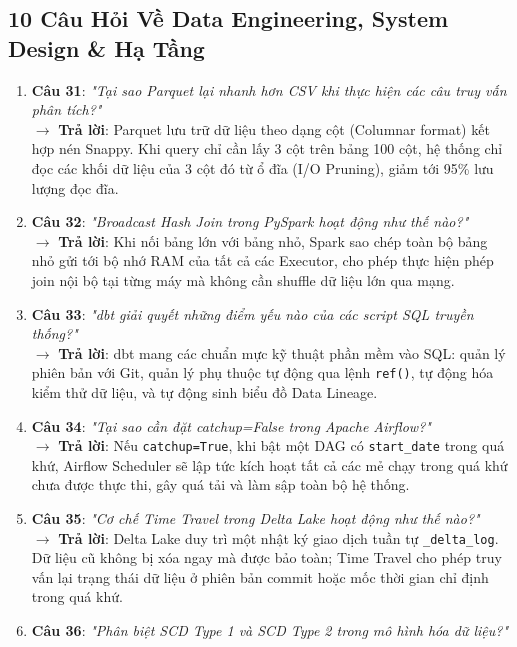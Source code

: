 \subsection{10 Câu Hỏi Về Data Engineering, System Design \& Hạ Tầng}
\begin{enumerate}
    \item \textbf{Câu 31}: \textit{"Tại sao Parquet lại nhanh hơn CSV khi thực hiện các câu truy vấn phân tích?"} \\
    $\rightarrow$ \textbf{Trả lời}: Parquet lưu trữ dữ liệu theo dạng cột (Columnar format) kết hợp nén Snappy. Khi query chỉ cần lấy 3 cột trên bảng 100 cột, hệ thống chỉ đọc các khối dữ liệu của 3 cột đó từ ổ đĩa (I/O Pruning), giảm tới 95\% lưu lượng đọc đĩa.
    \item \textbf{Câu 32}: \textit{"Broadcast Hash Join trong PySpark hoạt động như thế nào?"} \\
    $\rightarrow$ \textbf{Trả lời}: Khi nối bảng lớn với bảng nhỏ, Spark sao chép toàn bộ bảng nhỏ gửi tới bộ nhớ RAM của tất cả các Executor, cho phép thực hiện phép join nội bộ tại từng máy mà không cần shuffle dữ liệu lớn qua mạng.
    \item \textbf{Câu 33}: \textit{"dbt giải quyết những điểm yếu nào của các script SQL truyền thống?"} \\
    $\rightarrow$ \textbf{Trả lời}: dbt mang các chuẩn mực kỹ thuật phần mềm vào SQL: quản lý phiên bản với Git, quản lý phụ thuộc tự động qua lệnh \texttt{ref()}, tự động hóa kiểm thử dữ liệu, và tự động sinh biểu đồ Data Lineage.
    \item \textbf{Câu 34}: \textit{"Tại sao cần đặt catchup=False trong Apache Airflow?"} \\
    $\rightarrow$ \textbf{Trả lời}: Nếu \texttt{catchup=True}, khi bật một DAG có \texttt{start\_date} trong quá khứ, Airflow Scheduler sẽ lập tức kích hoạt tất cả các mẻ chạy trong quá khứ chưa được thực thi, gây quá tải và làm sập toàn bộ hệ thống.
    \item \textbf{Câu 35}: \textit{"Cơ chế Time Travel trong Delta Lake hoạt động như thế nào?"} \\
    $\rightarrow$ \textbf{Trả lời}: Delta Lake duy trì một nhật ký giao dịch tuần tự \texttt{\_delta\_log}. Dữ liệu cũ không bị xóa ngay mà được bảo toàn; Time Travel cho phép truy vấn lại trạng thái dữ liệu ở phiên bản commit hoặc mốc thời gian chỉ định trong quá khứ.
    \item \textbf{Câu 36}: \textit{"Phân biệt SCD Type 1 và SCD Type 2 trong mô hình hóa dữ liệu?"} \\

\end{enumerate}
